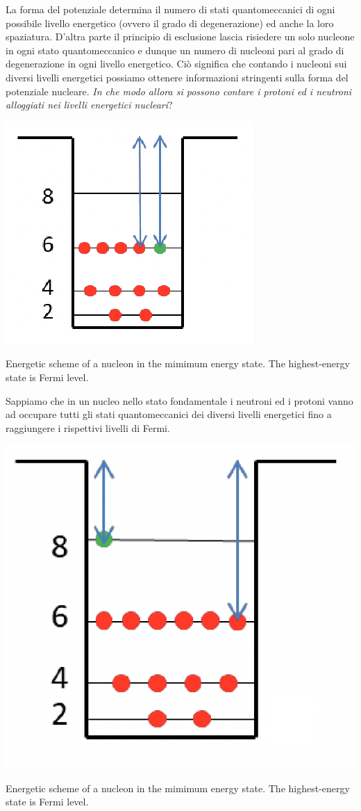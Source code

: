 La forma del potenziale determina il numero di stati quantomeccanici di ogni possibile livello energetico (ovvero il grado di degenerazione) ed anche la loro spaziatura.
D’altra parte il principio di esclusione lascia risiedere un solo nucleone in ogni stato quantomeccanico e dunque un numero di nucleoni pari al grado di degenerazione in ogni livello energetico.
Ciò significa che contando i nucleoni sui diversi livelli energetici possiamo ottenere informazioni stringenti sulla forma del potenziale nucleare. \emph{In che modo allora si possono contare i protoni ed i neutroni alloggiati nei livelli energetici nucleari}?
\begin{marginfigure}
	\includegraphics{figs/energy-level-shell1}
	    \caption{Energetic scheme of a nucleon in the mimimum energy state. The highest-energy state is Fermi level.}
	\label{fig:energy-level-shell1}
\end{marginfigure}
Sappiamo che in un nucleo nello stato fondamentale i neutroni ed i protoni vanno ad occupare tutti gli stati quantomeccanici dei diversi livelli energetici fino a raggiungere i rispettivi livelli di Fermi.
\begin{marginfigure}
	\includegraphics{figs/energy-level-shell2}
	\caption{Energetic scheme of a nucleon in the mimimum energy state. The highest-energy state is Fermi level.}
	\label{fig:energy-level-shell2}
\end{marginfigure}
